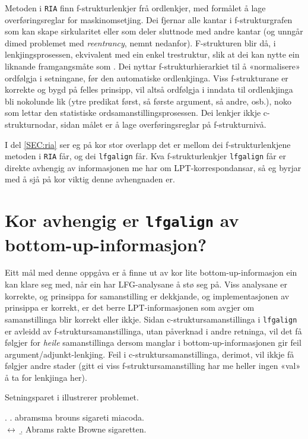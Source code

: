 \documentclass[11pt,a4paper,oneside,draft]{report}
\begin{document}
 Metoden i \texttt{RIA} \citep{graham2009osr,graham2009fts} finn
 f-strukturlenkjer frå ordlenkjer, med formålet å lage
 overføringsreglar for maskinomsetjing. Dei fjernar alle kantar i
 f-strukturgrafen som kan skape sirkularitet eller som deler sluttnode
 med andre kantar (og unngår dimed problemet med \emph{reentrancy}, nemnt
 nedanfor). F-strukturen blir då, i lenkjingsprosessen, ekvivalent med
 ein enkel trestruktur, slik at dei kan nytte ein liknande
 framgangsmåte som \citet{samuelsson2007apa}.  Dei nyttar
 f-strukturhierarkiet til å «normalisere» ordfølgja i setningane, før
 den automatiske ordlenkjinga. Viss f-strukturane er korrekte og bygd
 på felles prinsipp, vil altså ordfølgja i inndata til ordlenkjinga
 bli nokolunde lik (ytre predikat først, så første argument, så andre,
 osb.), noko som lettar den statistiske ordsamanstillingsprosessen.
 Dei lenkjer ikkje c-strukturnodar, sidan målet er å lage
 overføringsreglar på f-strukturnivå.

 I del \ref{SEC:ria} ser eg på kor stor overlapp det er mellom dei
 f-strukturlenkjene metoden i \texttt{RIA} får, og dei \texttt{lfgalign} får. Kva
 f-strukturlenkjer \texttt{lfgalign} får er direkte avhengig av informasjonen
 me har om LPT-korrespondansar, så eg byrjar med å sjå på kor viktig
 denne avhengnaden er.

 
\section{Kor avhengig er \texttt{lfgalign} av bottom-up-informasjon?}
\label{sec-5.3}

 Eitt mål med denne oppgåva er å finne ut av kor lite
 bottom-up-informasjon ein kan klare seg med, når ein har
 LFG-analysane å stø seg på. Viss analysane er korrekte, og prinsippa
 for samanstilling er dekkjande, og implementasjonen av prinsippa er
 korrekt, er det berre LPT-informasjonen som avgjer om samanstillinga
 blir korrekt eller ikkje. Sidan c-struktursamanstillinga i \texttt{lfgalign}
 er avleidd av f-struktursamanstillinga, utan påverknad i andre
 retninga, vil det få følgjer for \emph{heile} samanstillinga dersom
 manglar i bottom-up-informasjonen gir feil
 argument/adjunkt-lenkjing. Feil i c-struktursamanstillinga, derimot,
 vil ikkje få følgjer andre stader (gitt ei viss
 f-struktursamanstilling har me heller ingen «val» å ta for lenkjinga
 her).

 Setningsparet i \Next illustrerer problemet.

\ex. \a. abramsma brouns sigareti miacoda.\\
     $\leftrightarrow$
     \b. Abrams rakte Browne sigaretten.
     
\end{document}
